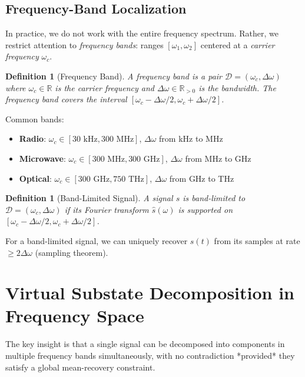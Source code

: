 \documentclass[twocolumn,11pt,a4paper]{article}
\newtheorem{definition}[theorem]{Definition}
\newcommand{\signal}{s}
\newcommand{\bandwidth}{\Delta{\omega}}
\newcommand{\domain}{\mathcal{D}}
\newcommand{\freq}{\omega}
\begin{document}
\subsection{Frequency-Band Localization}

In practice, we do not work with the entire frequency spectrum. Rather, we restrict attention to \emph{frequency bands}: ranges $[\freq_1, \freq_2]$ centered at a \emph{carrier frequency} $\freq_c$.

\begin{definition}[Frequency Band]
A \emph{frequency band} is a pair $\domain = (\freq_c, \bandwidth)$ where $\freq_c \in \mathbb{R}$ is the \emph{carrier frequency} and $\bandwidth \in \mathbb{R}_{>0}$ is the \emph{bandwidth}. The frequency band covers the interval $[\freq_c - \bandwidth/2, \freq_c + \bandwidth/2]$.
\end{definition}

Common bands:
\begin{itemize}[nosep]
  \item \textbf{Radio}: $\freq_c \in [30\text{ kHz}, 300\text{ MHz}]$, $\bandwidth$ from kHz to MHz
  \item \textbf{Microwave}: $\freq_c \in [300\text{ MHz}, 300\text{ GHz}]$, $\bandwidth$ from MHz to GHz
  \item \textbf{Optical}: $\freq_c \in [300\text{ GHz}, 750\text{ THz}]$, $\bandwidth$ from GHz to THz
\end{itemize}

\begin{definition}[Band-Limited Signal]
A signal $\signal$ is \emph{band-limited to} $\domain = (\freq_c, \bandwidth)$ if its Fourier transform $\hat{\signal}(\freq)$ is supported on $[\freq_c - \bandwidth/2, \freq_c + \bandwidth/2]$.
\end{definition}

For a band-limited signal, we can uniquely recover $\signal(t)$ from its samples at rate $\geq 2\bandwidth$ (sampling theorem).

\section{Virtual Substate Decomposition in Frequency Space}
\label{sec:virt_freq}

The key insight is that a single signal can be decomposed into components in multiple frequency bands simultaneously, with no contradiction *provided* they satisfy a global mean-recovery constraint.
\end{document}
